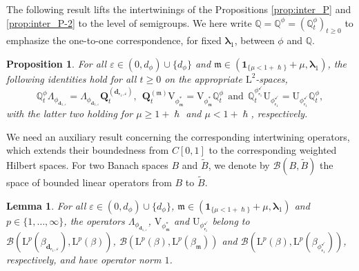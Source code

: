 \documentclass[JEP,XML,SOM,Unicode]{cedram}
\let\epsilon\varepsilon
\theoremstyle{plain}
\newtheorem{lemma}[theorem]{Lemma}
\newtheorem{proposition}[theorem]{Proposition}
\theoremstyle{definition}
\newcommand{\J}{\mathds{Q}}
\newcommand{\Leb}{\mathrm{L}}
\newcommand{\m}{\mathfrak{m}}
\newcommand{\dpt}{\bm{d}_{\vat,\epsilon}}
\newcommand{\dz}{{\bm{d}}_{1,\epsilon}}
\newcommand{\Bop}[2]{\mathcal{B}(#1,#2)}
\newcommand{\lam}{{\bm{\lambda}_1}}
\newcommand{\vat}{{\mathsf{r}_1}}
\newcommand{\phm}{{\phi_\m^*}}
\renewcommand{\varphi}{{\phi_{\vat}^{\checkmark}}}
\newcommand{\Q}[1][\mo]{\mathbf{Q}^{({#1})}}
\newcommand{\gab}[1][\lam,\mo]{{\beta_{#1}}}
\let\h\hslash
\let\mo\mu
\let\bpsi\beta
\begin{document}
The following result lifts the intertwinings of the Propositions \ref{prop:inter_P} and \ref{prop:inter_P-2} to the level of semigroups. We here write $\J=\J^\phi = (\J_t^\phi)_{t \geq 0}$ to emphasize the one-to-one correspondence, for fixed $\lam$, between $\phi$ and $\J$.

\begin{proposition}
\label{prop:intertwining}
For all $\epsilon \in (0,d_\phi) \cup \{d_\phi\}$ and $\m \in (\bm{1}_{\{\mo < 1+\h\}}+\mo,\lam)$,
the following identities hold for all $t \geq 0$ on the appropriate $\Leb^2$-spaces,
\begin{equation}
\label{eq:inter-right-d0}
\J_t^\phi \Lambda_{\phi_{\dz}} = \Lambda_{\phi_{\dz}} \Q[\dpt]_t, \ \ \Q[\m]_t \mathrm{V}_{\phm} = \mathrm{V}_{\phm} \J_t^\phi \ \ \text{and} \ \ \J_t^\varphi {\mathrm{U}}_\varphi = {\mathrm{U}}_\varphi \J_t^\phi,
\end{equation}
with the latter two holding for $\mo \geq 1+\h$ and $\mo < 1+\h$, respectively.
\end{proposition}

We need an auxiliary result concerning the corresponding intertwining operators, which extends their boundedness from $C[0,1]$ to the corresponding weighted Hilbert spaces. For two Banach spaces $B$ and $\widetilde{B}$, we denote by $\Bop{B}{\widetilde{B}}$ the space of bounded linear operators from $B$ to $\widetilde{B}$.

\begin{lemma}
\label{lem:Lambda-L2-bounded}
For all $\epsilon \in (0,d_\phi) \cup \{d_\phi\}$, $\m \in (\bm{1}_{\{\mo < 1+\h\}} + \mo, \lam)$ and
$p \in \{1,\ldots,\infty\}$, the operators $\Lambda_{\phi_{\dz}}$, $\mathrm{V}_{\phm}$ and $\mathrm{U}_\varphi$ belong to $\Bop{\Leb^p(\gab[\dpt])}{\Leb^p(\bpsi)}$, $\Bop{\Leb^p(\bpsi)}{\Leb^p(\gab[\m])}$ and $\Bop{\Leb^p(\bpsi)}{\Leb^p(\bpsi_\varphi)}$, respectively, and have operator norm $1$.
\end{lemma}
\end{document}
